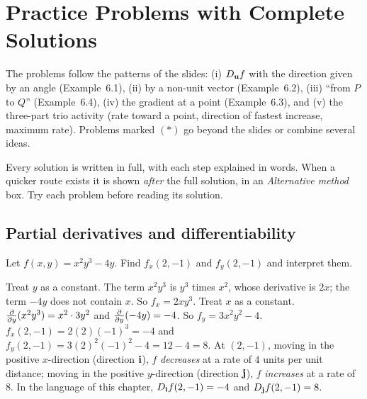 \section{Practice Problems with Complete Solutions}\label{ch:practice}

The problems follow the patterns of the slides: (i) $D_{\mathbf{u}} f$ with the
direction given by an angle (Example~6.1), (ii) by a non-unit vector
(Example~6.2), (iii) ``from $P$ to $Q$'' (Example~6.4), (iv) the gradient at a
point (Example~6.3), and (v) the three-part trio activity (rate toward a
point, direction of fastest increase, maximum rate). Problems marked $(*)$ go
beyond the slides or combine several ideas.

Every solution is written in full, with each step explained in words. When a
quicker route exists it is shown \emph{after} the full solution, in an
\emph{Alternative method} box. Try each problem before reading its solution.

\subsection{Partial derivatives and differentiability}

\begin{problem}\label{prob:p1}
Let $f(x,y)=x^2y^3-4y$. Find $f_x(2,-1)$ and $f_y(2,-1)$ and interpret them.
\end{problem}
\begin{solution}
 Treat $y$ as a constant. The term $x^2y^3$ is $y^3$ times $x^2$, whose derivative
is $2x$; the term $-4y$ does not contain $x$. So $f_x=2xy^3$.
 Treat $x$ as a constant. $\frac{\partial }{\partial y}(x^2y^3)=x^2\cdot3y^2$ and $\frac{\partial }{\partial y}(-4y)=-4$. So $f_y=3x^2y^2-4$.
$f_x(2,-1)=2(2)(-1)^3=-4$ and $f_y(2,-1)=3(2)^2(-1)^2-4=12-4=8$.
 At $(2,-1)$, moving in the positive $x$-direction (direction $\mathbf{i}$),
$f$ \emph{decreases} at a rate of $4$ units per unit distance; moving in the positive
$y$-direction (direction $\mathbf{j}$), $f$ \emph{increases} at a rate of $8$. In the language of
this chapter, $D_{\mathbf{i}}f(2,-1)=-4$ and $D_{\mathbf{j}}f(2,-1)=8$.
\end{solution}

